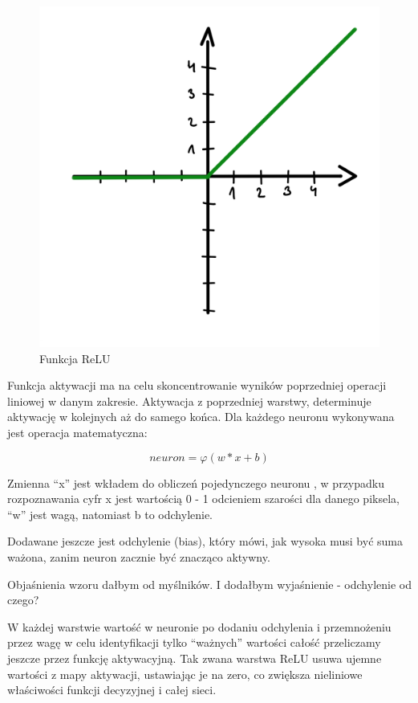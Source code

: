 \documentclass[brudnopis]{xmgr}
\begin{document}
\begin{figure}[!tbh]
\centering
\includegraphics[width=.8\hsize]{fig/4}
\caption{Funkcja ReLU\label{RYS.3}}
\end{figure}

Funkcja aktywacji ma na celu skoncentrowanie wyników poprzedniej operacji liniowej w danym zakresie.
Aktywacja z poprzedniej warstwy, determinuje aktywację w kolejnych aż do samego końca. 
Dla każdego neuronu wykonywana jest operacja matematyczna:

\begin{equation}
neuron  = φ (w * x + b)
\end{equation}



 Zmienna “x” jest wkładem do obliczeń pojedynczego neuronu , w przypadku rozpoznawania cyfr x jest wartością 0 - 1 odcieniem szarości dla danego piksela, “w” jest wagą, natomiast b to odchylenie.
 
 
 Dodawane jeszcze jest odchylenie (bias), który mówi, jak wysoka musi być suma ważona, zanim neuron zacznie być znacząco aktywny.
 
 
  Objaśnienia wzoru dałbym od myślników. I dodałbym wyjaśnienie - odchylenie od czego?

W każdej warstwie  wartość w neuronie po dodaniu odchylenia i przemnożeniu przez wagę w celu identyfikacji tylko “ważnych” wartości całość przeliczamy jeszcze przez funkcję aktywacyjną. 
Tak zwana warstwa ReLU usuwa ujemne wartości z mapy aktywacji, ustawiając je na zero, co zwiększa nieliniowe właściwości funkcji decyzyjnej i całej sieci.
\end{document}
